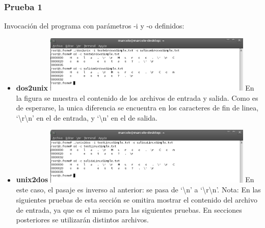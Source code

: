 \documentclass[a4paper,10pt]{article}
\begin{document}
    \subsubsection{Prueba 1}
    Invocaci\'on del programa con par\'ametros -i y -o definidos:
    \begin{itemize}
      \item \textbf{dos2unix}
      \newline	
      \includegraphics[width=10cm, viewport=0 0 901 246]{../Informe/Imagenes/prueba1-invocacion-dos2unix.png}
      \newline
      En la figura se muestra el contenido de los archivos de entrada y salida. Como es de esperarse, la unica diferencia
      se encuentra en los caracteres de fin de linea, `\textbackslash r\textbackslash n' en el de entrada, y `\textbackslash n' en el de salida.
      \item \textbf{unix2dos}
      \newline
      \includegraphics[width=10cm, viewport=0 0 899 246]{../Informe/Imagenes/prueba1-invocacion-unix2dos.png}
      \newline
      En este caso, el pasaje es inverso al anterior: se pasa de `\textbackslash n' a `\textbackslash r\textbackslash n'.	
      \newline
      Nota: En las siguientes pruebas de esta secci\'on se omitira mostrar el contenido del archivo de entrada, ya que es el mismo
      para las siguientes pruebas. En secciones posteriores se utilizar\'an distintos archivos.
    \end{itemize}
\end{document}

